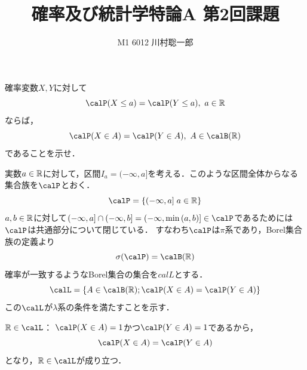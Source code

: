 \documentclass[dvipdfmx]{jsreport}
\title{確率及び統計学特論A 第2回課題}
\author{M1 6012 川村聡一郎}
\date{}
\begin{document}
\maketitle

\begin{tcolorbox}
	確率変数$X, Y$に対して
\begin{equation*}
	\calP(X\le a)= \calP(Y\le a),\ a\in \R
\end{equation*}
	ならば，
\begin{equation*}
	\calP(X\in A)= \calP(Y\in A),\ A\in \calB(\R)
\end{equation*}
	であることを示せ．
\end{tcolorbox}


\begin{souanswer} %
	実数$a\in \mathbb{R}$に対して，区間$I_a= (-\infty, a]$を考える．このような区間全体からなる集合族を$\calP$とおく．
\begin{equation}
	\calP= \{(-\infty, a]\; a\in \R\}
\end{equation}
	$a, b\in\mathbb{R}$に対して$(-\infty, a]\cap (-\infty, b]= (-\infty, \min{(a, b)}]\in \calP$であるためには$\calP$は共通部分について閉じている．
	すなわち$\calP$は$\pi$系であり，Borel集合族の定義より
\begin{equation}
	\sigma(\calP)= \calB(\R)
\end{equation}
	確率が一致するようなBorel集合の集合を$calL$とする．
\begin{equation}
	\calL= \{A\in \calB(\R); \calP(X\in A)= \calP(Y\in A)\}
\end{equation}
	この$\calL$が$\lambda$系の条件を満たすことを示す．
\begin{enumerate_alpha}
	\item $\R\in \calL$：
	$\calP(X\in A)= 1$かつ$\calP(Y\in A)= 1$であるから，
\begin{equation}
	\calP(X\in A)= \calP(Y\in A)
\end{equation}
	となり，$\R\in \calL$が成り立つ．


\end{enumerate_alpha}
\end{souanswer}
\end{document}
